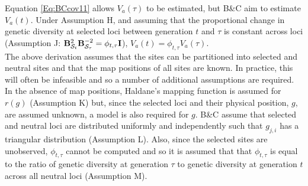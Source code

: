 \documentclass[12pt]{article}
\begin{document}
\begin{bibunit}
Equation \ref{Eq:BCcov11} allows $V_a(\tau)$ to be estimated, but B\&C aim to estimate $V_a(t)$.  Under Assumption H, and assuming that the proportional change in genetic diversity at selected loci between generation $t$ and $\tau$ is constant across loci (Assumption J: ${\bf B}_{\mathcal{S}_t}^2{\bf B}_{\mathcal{S}_\tau}^{-2} = \phi_{t,\tau}{\bf I}$), $V_a(t)=\phi_{t,\tau} V_a(\tau)$.\\ 

The above derivation assumes that the sites can be partitioned into selected and neutral sites and that the map positions of all sites are known.  In practice, this will often be infeasible and so a number of additional assumptions are required. In the absence of map positions, Haldane's \citeyearpar{haldane1919map} mapping function is assumed for $r(g)$ (Assumption K) but, since the selected loci and their physical position, $g$, are assumed unknown, a model is also required for $g$. B\&C assume that selected and neutral loci are distributed uniformly and independently such that $g_{j,i}$ has a triangular distribution (Assumption L). Also, since the selected sites are unobserved, $\phi_{t,\tau}$ cannot be computed and so it is assumed that that $\phi_{t,\tau}$ is equal to the ratio of genetic diversity at generation $\tau$ to genetic diversity at generation $t$ across all neutral loci (Assumption M). \\ 


\end{bibunit}
\end{document}
